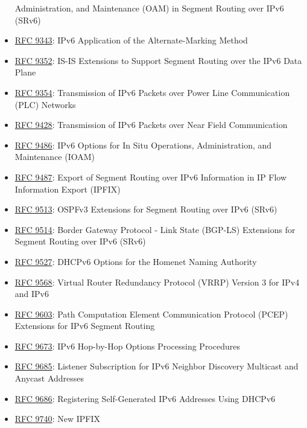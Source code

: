 \documentclass[
]{article}
\begin{document}
\begin{itemize}
  Administration, and Maintenance (OAM) in Segment Routing over IPv6
  (SRv6)
\item
  \href{https://www.rfc-editor.org/info/rfc9343}{RFC 9343}: IPv6
  Application of the Alternate-Marking Method
\item
  \href{https://www.rfc-editor.org/info/rfc9352}{RFC 9352}: IS-IS
  Extensions to Support Segment Routing over the IPv6 Data Plane
\item
  \href{https://www.rfc-editor.org/info/rfc9354}{RFC 9354}: Transmission
  of IPv6 Packets over Power Line Communication (PLC) Networks
\item
  \href{https://www.rfc-editor.org/info/rfc9428}{RFC 9428}: Transmission
  of IPv6 Packets over Near Field Communication
\item
  \href{https://www.rfc-editor.org/info/rfc9486}{RFC 9486}: IPv6 Options
  for In Situ Operations, Administration, and Maintenance (IOAM)
\item
  \href{https://www.rfc-editor.org/info/rfc9487}{RFC 9487}: Export of
  Segment Routing over IPv6 Information in IP Flow Information Export
  (IPFIX)
\item
  \href{https://www.rfc-editor.org/info/rfc9513}{RFC 9513}: OSPFv3
  Extensions for Segment Routing over IPv6 (SRv6)
\item
  \href{https://www.rfc-editor.org/info/rfc9514}{RFC 9514}: Border
  Gateway Protocol - Link State (BGP-LS) Extensions for Segment Routing
  over IPv6 (SRv6)
\item
  \href{https://www.rfc-editor.org/info/rfc9527}{RFC 9527}: DHCPv6
  Options for the Homenet Naming Authority
\item
  \href{https://www.rfc-editor.org/info/rfc9568}{RFC 9568}: Virtual
  Router Redundancy Protocol (VRRP) Version 3 for IPv4 and IPv6
\item
  \href{https://www.rfc-editor.org/info/rfc9603}{RFC 9603}: Path
  Computation Element Communication Protocol (PCEP) Extensions for IPv6
  Segment Routing
\item
  \href{https://www.rfc-editor.org/info/rfc9673}{RFC 9673}: IPv6
  Hop-by-Hop Options Processing Procedures
\item
  \href{https://www.rfc-editor.org/info/rfc9685}{RFC 9685}: Listener
  Subscription for IPv6 Neighbor Discovery Multicast and Anycast
  Addresses
\item
  \href{https://www.rfc-editor.org/info/rfc9686}{RFC 9686}: Registering
  Self-Generated IPv6 Addresses Using DHCPv6
\item
  \href{https://www.rfc-editor.org/info/rfc9740}{RFC 9740}: New IPFIX

\end{itemize}
\end{document}
